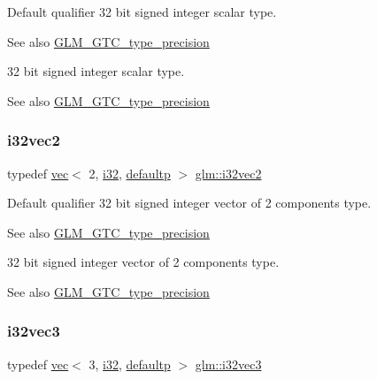 Default qualifier 32 bit signed integer scalar type. \begin{DoxySeeAlso}{See also}
\mbox{\hyperlink{group__gtc__type__precision}{G\+L\+M\+\_\+\+G\+T\+C\+\_\+type\+\_\+precision}}
\end{DoxySeeAlso}
32 bit signed integer scalar type. \begin{DoxySeeAlso}{See also}
\mbox{\hyperlink{group__gtc__type__precision}{G\+L\+M\+\_\+\+G\+T\+C\+\_\+type\+\_\+precision}} 
\end{DoxySeeAlso}
\mbox{\label{group__gtc__type__precision_ga99191e0de942ecc1df32d522f8064789}} 
\subsubsection{\texorpdfstring{i32vec2}{i32vec2}}
{\footnotesize\ttfamily typedef \mbox{\hyperlink{structglm_1_1vec}{vec}}$<$ 2, \mbox{\hyperlink{group__gtc__type__precision_ga1d8ed5c43e91ea7d4528389da4fa9524}{i32}}, \mbox{\hyperlink{namespaceglm_a36ed105b07c7746804d7fdc7cc90ff25a9d21ccd8b5a009ec7eb7677befc3bf51}{defaultp}} $>$ \mbox{\hyperlink{group__gtc__type__precision_ga99191e0de942ecc1df32d522f8064789}{glm\+::i32vec2}}}

Default qualifier 32 bit signed integer vector of 2 components type. \begin{DoxySeeAlso}{See also}
\mbox{\hyperlink{group__gtc__type__precision}{G\+L\+M\+\_\+\+G\+T\+C\+\_\+type\+\_\+precision}}
\end{DoxySeeAlso}
32 bit signed integer vector of 2 components type. \begin{DoxySeeAlso}{See also}
\mbox{\hyperlink{group__gtc__type__precision}{G\+L\+M\+\_\+\+G\+T\+C\+\_\+type\+\_\+precision}} 
\end{DoxySeeAlso}
\mbox{\label{group__gtc__type__precision_ga9811a4ec26e517ea85c785d3f3f4baac}} 
\subsubsection{\texorpdfstring{i32vec3}{i32vec3}}
{\footnotesize\ttfamily typedef \mbox{\hyperlink{structglm_1_1vec}{vec}}$<$ 3, \mbox{\hyperlink{group__gtc__type__precision_ga1d8ed5c43e91ea7d4528389da4fa9524}{i32}}, \mbox{\hyperlink{namespaceglm_a36ed105b07c7746804d7fdc7cc90ff25a9d21ccd8b5a009ec7eb7677befc3bf51}{defaultp}} $>$ \mbox{\hyperlink{group__gtc__type__precision_ga9811a4ec26e517ea85c785d3f3f4baac}{glm\+::i32vec3}}}

